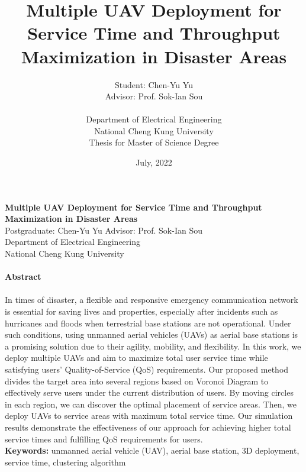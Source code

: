 \documentclass[a4paper,12pt]{report}
\title{Multiple UAV Deployment for Service Time and Throughput Maximization in Disaster Areas\\}
\author{Student: Chen-Yu Yu \\
Advisor: Prof. Sok-Ian Sou\\
\\
Department of Electrical Engineering  \\
National Cheng Kung University \\
Thesis for Master of Science Degree \\
}
\date{July, 2022}
\begin{document}

\maketitle

\begin{titlepage}
    \begin{center}
        {\bf\large Multiple UAV Deployment for Service Time and Throughput Maximization in Disaster Areas}\\
        {Postgraduate: Chen-Yu Yu \hspace{8mm} Advisor: Prof. Sok-Ian Sou}\\
        {Department of Electrical Engineering}\\
        {National Cheng Kung University}\\
    \end{center}

    \paragraph{}
    \begin{center}
        {\bf Abstract}\\
    \end{center}
    \paragraph{}
    In times of disaster, a flexible and responsive emergency communication network is essential for saving lives and properties, especially after incidents such as hurricanes and floods when terrestrial base stations are not operational. Under such conditions, using unmanned aerial vehicles (UAVs) as aerial base stations is a promising solution due to their agility, mobility, and flexibility. In this work, we deploy multiple UAVs and aim to maximize total user service time while satisfying users' Quality-of-Service (QoS) requirements. Our proposed method divides the target area into several regions based on Voronoi Diagram to effectively serve users under the current distribution of users. By moving circles in each region, we can discover the optimal placement of service areas. Then, we deploy UAVs to service areas with maximum total service time. Our simulation results demonstrate the effectiveness of our approach for achieving higher total service times and fulfilling QoS requirements for users.\\
    
    \textbf{Keywords:} {unmanned aerial vehicle (UAV), aerial base station, 3D deployment, service time, clustering algorithm}
\end{titlepage}
\end{document}
